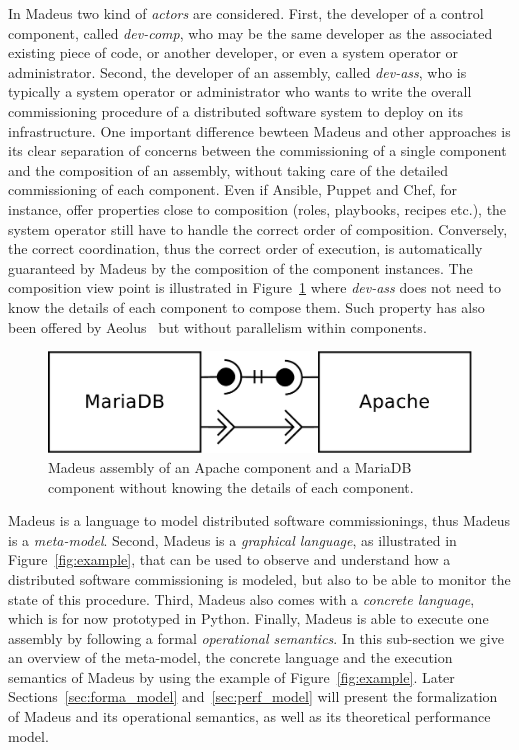 In Madeus two kind of \emph{actors} are considered. First, the
developer of a control component, called \emph{dev-comp}, who may be
the same developer as the associated existing piece of code, or
another developer, or even a system operator or administrator. Second,
the developer of an assembly, called \emph{dev-ass}, who is typically
 a system operator or administrator
who wants to write the overall commissioning procedure of a
distributed software system to deploy on its infrastructure. One
important difference bewteen Madeus and other approaches is its clear
separation of concerns between the commissioning of a single component
and the composition of an assembly, without taking care of the
detailed commissioning of each component. Even if Ansible, Puppet and
Chef, for instance, offer properties close to composition (\eg roles,
playbooks, recipes etc.), the system operator still have to handle the
correct order of composition. Conversely, the correct coordination,
thus the correct order of execution, is automatically guaranteed by
Madeus by the composition of the component instances. The composition
view point is illustrated in Figure~\ref{fig:simple} where
\emph{dev-ass} does not need to know the details of each component to
compose them. Such property has also been offered by Aeolus~\cite{}
but without parallelism within components.

\begin{figure}[tbp]
  \begin{center}
    \includegraphics[width=0.6\linewidth]{./images/simpleass.pdf}
  \end{center}
  \caption{Madeus assembly of an Apache component and a MariaDB
    component without knowing the details of each component.}
  \label{fig:simple}
\end{figure}

Madeus is a language to model distributed software commissionings,
thus Madeus is a \emph{meta-model}. Second, Madeus is a
\emph{graphical language}, as illustrated in Figure~\ref{fig:example},
that can be used to observe and understand how a distributed software
commissioning is modeled, but also to be able to monitor the state of
this procedure. Third, Madeus also comes with a \emph{concrete
  language}, which is for now prototyped in Python. Finally, Madeus is
able to execute one assembly by following a formal \emph{operational
  semantics}. In this sub-section we give an overview of the
meta-model, the concrete language and the execution semantics of
Madeus by using the example of Figure~\ref{fig:example}. Later
Sections~\ref{sec:forma_model} and~\ref{sec:perf_model} will present
the formalization of Madeus and its operational semantics, as well as
its theoretical performance model.

